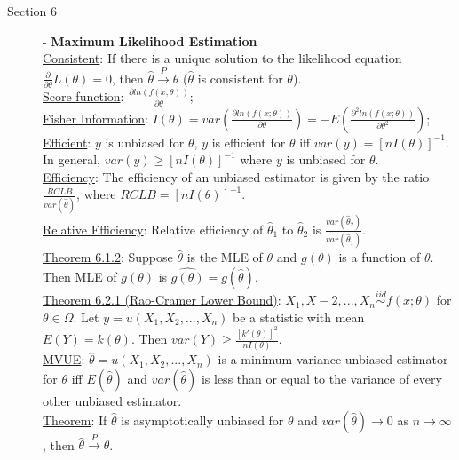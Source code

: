 \documentclass[10pt,landscape]{article}
\begin{document}
\begin{multicols}{3}
   	\begin{description}  %
   		\item[Section 6] - \textbf{Maximum Likelihood Estimation }\\
   		\underline{Consistent}: If there is a unique solution to the likelihood equation $\frac{\partial}{\partial \theta}L(\theta) = 0$, then $\hat{\theta} \overset{P}{\rightarrow} \theta	$ ($\hat{\theta}$ is consistent for $\theta$).\\
   		\underline{Score function}: $\frac{\partial ln(f(x; \theta))}{\partial \theta}$;\\
   		\underline{Fisher Information}: $I(\theta)= var(\frac{\partial ln(f(x; \theta))}{\partial \theta}) = -E(\frac{\partial^2 ln(f(x; \theta))}{\partial \theta^2})$;\\
   		\underline{Efficient}: $y$ is unbiased for $\theta$, $y$ is efficient for $\theta$ iff $var(y) = [nI(\theta)]^{-1}$. In general, $var(y) \geq [nI(\theta)]^{-1}$ where $y$ is unbiased for $\theta$. \\
   		\underline{Efficiency}: The efficiency of an unbiased estimator is given by the ratio $\frac{RCLB}{var(\hat{\theta})}$, where $RCLB = [nI(\theta)]^{-1}$. \\
   		\underline{Relative Efficiency}: Relative efficiency of $\hat{\theta}_1$ to $\hat{\theta}_2$ is $\frac{var(\hat{\theta}_2)}{var(\hat{\theta}_1)}$. \\
   		\underline{Theorem 6.1.2}: Suppose $\hat{\theta}$ is the MLE of $\theta$ and $g(\theta)$ is a function of $\theta$. Then MLE of $g(\theta)$ is $\hat{g(\theta)} = g(\hat{\theta})$. \\
   		\underline{Theorem 6.2.1 (Rao-Cramer Lower Bound)}: $X_1, X-2, ..., X_n \overset{iid}{\sim} f(x; \theta)$ for $\theta \in \Omega$. Let $y = u(X_1,X_2, ..., X_n)$ be a statistic with mean $E(Y) = k(\theta)$. Then $var(Y) \geq \frac{[k'(\theta)]^2}{nI(\theta)}$. \\
   		\underline{MVUE}: $\hat{\theta} = u(X_1, X_2, ..., X_n)$ is a minimum variance unbiased estimator for $\theta$  iff $E(\hat{\theta})$ and $var(\hat{\theta})$ is less than or equal to the variance of every other unbiased  estimator. \\
   		\underline{Theorem}: If $\hat{\theta}$ is asymptotically unbiased for $\theta$ and $var(\hat{\theta}) \rightarrow 0$ as $n\rightarrow \infty$, then $\hat{\theta} \overset{P}{\rightarrow} \theta$. 
	\end{description}      


\end{multicols}
\end{document}
